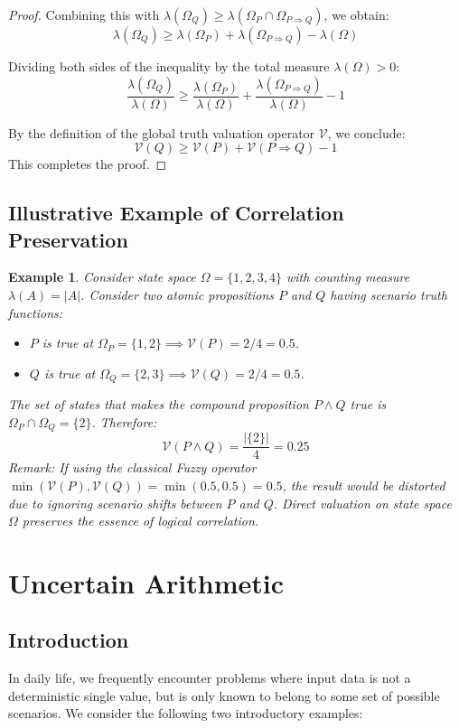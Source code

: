 \documentclass[a4paper,12pt, twoside]{memoir}
\newtheorem{example}{Example}[chapter]
\newcommand{\ddclmd}{\mathcal{V}} %
\begin{document}
\begin{proof}
	Combining this with $\lambda(\Omega_Q) \ge \lambda(\Omega_P \cap \Omega_{P \Rightarrow Q})$, we obtain:
	\[
		\lambda(\Omega_Q) \ge \lambda(\Omega_P) + \lambda(\Omega_{P \Rightarrow Q}) - \lambda(\Omega)
	\]

	Dividing both sides of the inequality by the total measure $\lambda(\Omega) > 0$:
	\[
		\frac{\lambda(\Omega_Q)}{\lambda(\Omega)} \ge \frac{\lambda(\Omega_P)}{\lambda(\Omega)} + \frac{\lambda(\Omega_{P \Rightarrow Q})}{\lambda(\Omega)} - 1
	\]

	By the definition of the global truth valuation operator $\ddclmd$, we conclude:
	\[
		\ddclmd(Q) \ge \ddclmd(P) + \ddclmd(P \Rightarrow Q) - 1
	\]
	This completes the proof.
\end{proof}
\section{Illustrative Example of Correlation Preservation}
\begin{example}
	Consider state space $\Omega = \{1, 2, 3, 4\}$ with counting measure $\lambda(A) = |A|$. Consider two atomic propositions $P$ and $Q$ having scenario truth functions:
	\begin{itemize}[leftmargin=*]
		\item $P$ is true at $\Omega_P = \{1, 2\} \implies \ddclmd(P) = 2/4 = 0.5$.
		\item $Q$ is true at $\Omega_Q = \{2, 3\} \implies \ddclmd(Q) = 2/4 = 0.5$.
	\end{itemize}
	The set of states that makes the compound proposition $P \land Q$ true is $\Omega_P \cap \Omega_Q = \{2\}$. Therefore:
	\[
		\ddclmd(P \land Q) = \frac{|\{2\}|}{4} = 0.25
	\]
	\textit{Remark:} If using the classical Fuzzy operator $\min(\ddclmd(P), \ddclmd(Q)) = \min(0.5, 0.5) = 0.5$, the result would be distorted due to ignoring scenario shifts between $P$ and $Q$. Direct valuation on state space $\Omega$ preserves the essence of logical correlation.
\end{example}

\chapter{Uncertain Arithmetic}

\section{Introduction}
In daily life, we frequently encounter problems where input data is not a deterministic single value, but is only known to belong to some set of possible scenarios. We consider the following two introductory examples:
\end{document}
